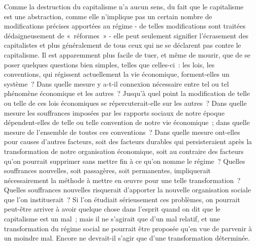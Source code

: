 \documentclass[french,twoside]{book} %
\begin{document}
Comme la destruction du capitalisme n'a aucun sens, du fait que le capitalisme est une abstraction, comme elle n'implique pas un certain nombre de modifications précises apportées au régime - de telles modifications sont traitées dédaigneusement de « réformes » - elle peut seulement signifier l'écra­sement des capitalistes et plus généralement de tous ceux qui ne se déclarent pas contre le capitalisme. Il est apparemment plus facile de tuer, et même de mourir, que de se poser quelques questions bien simples, telles que celles-ci : les lois, les conventions, qui régissent actuellement la vie économique, forment-elles un système ? Dans quelle mesure y a-t-il connexion nécessaire entre tel ou tel phénomène économique et les autres ? Jusqu'à quel point la modification de telle ou telle de ces lois économiques se répercuterait-elle sur les autres ? Dans quelle mesure les souffrances imposées par les rapports sociaux de notre époque dépendent-elles de telle ou telle convention de notre vie économique ; dans quelle mesure de l'ensemble de toutes ces conven­tions ? Dans quelle mesure ont-elles pour causes d'autres facteurs, soit des facteurs durables qui persisteraient après la transformation de notre organi­sation économique, soit au contraire des facteurs qu'on pourrait supprimer sans mettre fin à ce qu'on nomme le régime ? Quelles souffrances nouvelles, soit passagères, soit permanentes, impliquerait nécessairement la méthode à mettre en œuvre pour une telle transformation ? Quelles souffrances nouvelles risquerait d'apporter la nouvelle organisation sociale que l'on instituerait ? Si l'on étudiait sérieusement ces problèmes, on pourrait peut-être arriver à avoir quelque chose dans l'esprit quand on dit que le capitalisme est un mal ; mais il ne s'agirait que d'un mal relatif, et une transformation du régime social ne pourrait être proposée qu'en vue de parvenir à un moindre mal. Encore ne devrait-il s'agir que d'une transformation déterminée.\par
\end{document}
